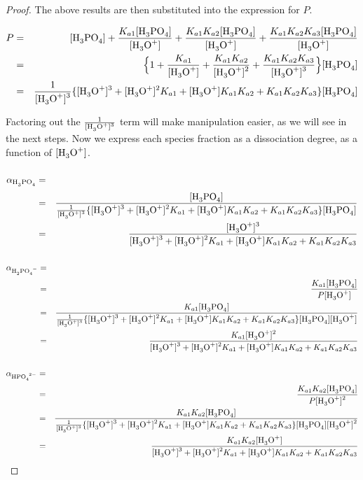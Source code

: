 \documentclass[10pt,twoside,a4paper]{article}
\begin{document}
\begin{proof}
 	The above results are then substituted into the expression for $P$.
 	
 	\begin{eqnarray}
 		P & = & \ce{[H_3PO_4]} + \frac{K_{a1}\ce{[H3PO4]}}{\ce{[H3O+]}} + \frac{K_{a1}K_{a2}\ce{[H3PO4]}}{\ce{[H3O+]}} + \frac{K_{a1}K_{a2}K_{a3}\ce{[H3PO4]}}{\ce{[H3O+]}}  \nonumber \\ 
 		& = & \Big\{ 1 + \frac{K_{a1}}{\ce{[H3O+]}} + \frac{K_{a1}K_{a2}}{\ce{[H3O+]^2}} + \frac{K_{a1}K_{a2}K_{a3}}{\ce{[H3O+]^3}} \Big\}\ce{[H3PO4]} \nonumber \\
 		& = & \frac{1}{\ce{[H3O+]^3}} \{ \ce{[H3O+]^3} + \ce{[H3O+]^2}K_{a1} + \ce{[H3O+]}K_{a1}K_{a2} + K_{a1}K_{a2}K_{a3}\}\ce{[H3PO4]} \nonumber
 		\end{eqnarray}
 		
 		
 	Factoring out the $\frac{1}{\ce{[H3O+]^3}}$ term will make manipulation easier, as we will see in the next steps. Now we express each species fraction as a dissociation degree, as a function of $\ce{[H3O+]}$.
 	
 	\begin{eqnarray}
 		\alpha_{\ce{H3PO4}} & = & \frac{\ce{[H3PO4]}}{P} \hspace{-10cm} \nonumber \\ 
 		& = & \frac{\ce{[H3PO4]}}{\frac{1}{\ce{[H3O+]^3}} \{ \ce{[H3O+]^3} + \ce{[H3O+]^2}K_{a1} + \ce{[H3O+]}K_{a1}K_{a2} + K_{a1}K_{a2}K_{a3}\}\ce{[H3PO4]}} \nonumber \\
 		& = & \frac{\ce{[H3O+]^3}}{\ce{[H3O+]^3} + \ce{[H3O+]^2}K_{a1} + \ce{[H3O+]}K_{a1}K_{a2} + K_{a1}K_{a2}K_{a3}}
 		\end{eqnarray}
 		
 	\begin{eqnarray}
 		\alpha_{\ce{H2PO4^{-}}} & = & \frac{\ce{[H2PO4^{-}]}}{P} \hspace{-10cm} \nonumber  \\ 
 		& = & \frac{K_{a1}\ce{[H3PO4]}}{P\ce{[H3O+]}} \nonumber \\
 		& = & \frac{K_{a1}\ce{[H3PO4]}}{\frac{1}{\ce{[H3O+]^3}} \{ \ce{[H3O+]^3} + \ce{[H3O+]^2}K_{a1} + \ce{[H3O+]}K_{a1}K_{a2} + K_{a1}K_{a2}K_{a3}\}\ce{[H3PO4][H3O+]}} \nonumber \\
 		& = & \frac{K_{a1}\ce{[H3O+]^2}}{\ce{[H3O+]^3} + \ce{[H3O+]^2}K_{a1} + \ce{[H3O+]}K_{a1}K_{a2} + K_{a1}K_{a2}K_{a3}} 
 		\end{eqnarray}
 		
 	\begin{eqnarray}
 		\alpha_{\ce{HPO4^{2-}}} & = & \frac{\ce{[HPO4^{2-}]}}{P} \hspace{-10cm} \nonumber  \\ 
 		& = & \frac{K_{a1}K_{a2}\ce{[H3PO4]}}{P\ce{[H3O+]^2}} \nonumber \\
 		& = & \frac{K_{a1}K_{a2}\ce{[H3PO4]}}{\frac{1}{\ce{[H3O+]^3}} \{ \ce{[H3O+]^3} + \ce{[H3O+]^2}K_{a1} + \ce{[H3O+]}K_{a1}K_{a2} + K_{a1}K_{a2}K_{a3}\}\ce{[H3PO4][H3O+]^2}} \nonumber \\
 		& = & \frac{K_{a1}K_{a2}\ce{[H3O+]}}{\ce{[H3O+]^3} + \ce{[H3O+]^2}K_{a1} + \ce{[H3O+]}K_{a1}K_{a2} + K_{a1}K_{a2}K_{a3}} 
 		\end{eqnarray}
 		

\end{proof}
\end{document}

